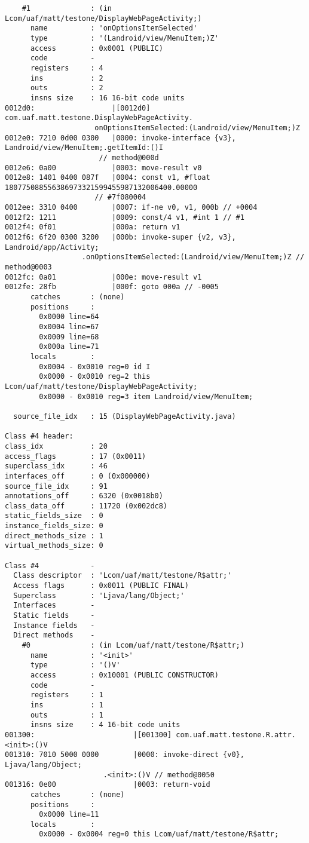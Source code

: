 \begin{lstlisting}
    #1              : (in Lcom/uaf/matt/testone/DisplayWebPageActivity;)
      name          : 'onOptionsItemSelected'
      type          : '(Landroid/view/MenuItem;)Z'
      access        : 0x0001 (PUBLIC)
      code          -
      registers     : 4
      ins           : 2
      outs          : 2
      insns size    : 16 16-bit code units
0012d0:                  |[0012d0] com.uaf.matt.testone.DisplayWebPageActivity.
				     onOptionsItemSelected:(Landroid/view/MenuItem;)Z
0012e0: 7210 0d00 0300   |0000: invoke-interface {v3}, Landroid/view/MenuItem;.getItemId:()I
			          // method@000d
0012e6: 0a00             |0003: move-result v0
0012e8: 1401 0400 087f   |0004: const v1, #float 180775088556386973321599455987132006400.00000
			         // #7f080004
0012ee: 3310 0400        |0007: if-ne v0, v1, 000b // +0004
0012f2: 1211             |0009: const/4 v1, #int 1 // #1
0012f4: 0f01             |000a: return v1
0012f6: 6f20 0300 3200   |000b: invoke-super {v2, v3}, Landroid/app/Activity;
				  .onOptionsItemSelected:(Landroid/view/MenuItem;)Z // method@0003
0012fc: 0a01             |000e: move-result v1
0012fe: 28fb             |000f: goto 000a // -0005
      catches       : (none)
      positions     :
        0x0000 line=64
        0x0004 line=67
        0x0009 line=68
        0x000a line=71
      locals        :
        0x0004 - 0x0010 reg=0 id I
        0x0000 - 0x0010 reg=2 this Lcom/uaf/matt/testone/DisplayWebPageActivity;
        0x0000 - 0x0010 reg=3 item Landroid/view/MenuItem;

  source_file_idx   : 15 (DisplayWebPageActivity.java)

Class #4 header:
class_idx           : 20
access_flags        : 17 (0x0011)
superclass_idx      : 46
interfaces_off      : 0 (0x000000)
source_file_idx     : 91
annotations_off     : 6320 (0x0018b0)
class_data_off      : 11720 (0x002dc8)
static_fields_size  : 0
instance_fields_size: 0
direct_methods_size : 1
virtual_methods_size: 0

Class #4            -
  Class descriptor  : 'Lcom/uaf/matt/testone/R$attr;'
  Access flags      : 0x0011 (PUBLIC FINAL)
  Superclass        : 'Ljava/lang/Object;'
  Interfaces        -
  Static fields     -
  Instance fields   -
  Direct methods    -
    #0              : (in Lcom/uaf/matt/testone/R$attr;)
      name          : '<init>'
      type          : '()V'
      access        : 0x10001 (PUBLIC CONSTRUCTOR)
      code          -
      registers     : 1
      ins           : 1
      outs          : 1
      insns size    : 4 16-bit code units
001300:                       |[001300] com.uaf.matt.testone.R.attr.<init>:()V
001310: 7010 5000 0000        |0000: invoke-direct {v0}, Ljava/lang/Object;
				       .<init>:()V // method@0050
001316: 0e00                  |0003: return-void
      catches       : (none)
      positions     :
        0x0000 line=11
      locals        :
        0x0000 - 0x0004 reg=0 this Lcom/uaf/matt/testone/R$attr;


\end{lstlisting}
